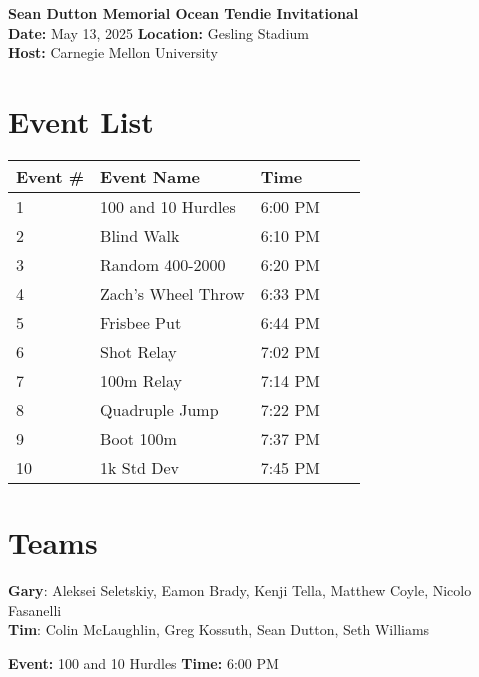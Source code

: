 \documentclass[10pt]{article}
\begin{document}
\begin{center}
    \LARGE \textbf{Sean Dutton Memorial Ocean Tendie Invitational} \\
    \large
    \vspace{0.5em}
    \textbf{Date:} May 13, 2025 \hspace{2cm} \textbf{Location:} Gesling Stadium \\
    \textbf{Host:} Carnegie Mellon University
\end{center}

\vspace{1em}

\section*{Event List}

\begin{tabular}{@{}lllll@{}}
\toprule
\textbf{Event \#} & \textbf{Event Name} &  \textbf{Time} \\
\midrule
1 & 100 and 10 Hurdles & 6:00 PM \\
2 & Blind Walk & 6:10 PM \\
3 & Random 400-2000 & 6:20 PM \\
4 & Zach's Wheel Throw & 6:33 PM \\
5 & Frisbee Put & 6:44 PM \\
6 & Shot Relay & 7:02 PM \\
7 & 100m Relay & 7:14 PM \\
8 & Quadruple Jump & 7:22 PM \\
9 & Boot 100m & 7:37 PM \\
10 & 1k Std Dev & 7:45 PM \\
\bottomrule
\end{tabular}


\vspace{2em}
\section*{Teams}

\textbf{Gary}: Aleksei Seletskiy, Eamon Brady, Kenji Tella, Matthew Coyle, Nicolo Fasanelli
\\\textbf{Tim}: Colin McLaughlin, Greg Kossuth, Sean Dutton, Seth Williams

\twocolumn


\textbf{Event:} 100 and 10 Hurdles \quad \textbf{Time:} 6:00 PM 
\end{document}
